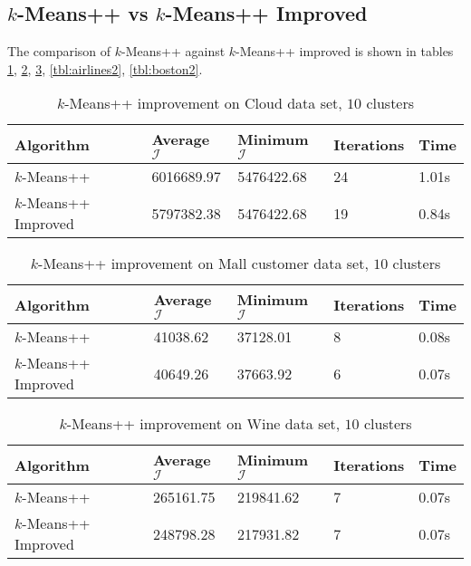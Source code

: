 \documentclass[twoside, 11pt]{article}
\newcommand{\I}{\mathcal{I}}
\begin{document}
	\subsection{$k$-Means++ vs $k$-Means++ Improved}
	The comparison of $k$-Means++ against $k$-Means++ improved is shown in tables \ref{tbl:cloud2}, \ref{tbl:mall2}, \ref{tbl:wine2}, \ref{tbl:airlines2}, \ref{tbl:boston2}.
		\begin{table}
			\begin{center}
				\begin{tabular}{|l|l|l|l|l|}
					\hline
					Algorithm & Average $\I$& Minimum $\I$& Iterations & Time\\\hline
					$k$-Means++ & 6016689.97& 5476422.68& 24 & 1.01s\\\hline
					$k$-Means++ Improved& 5797382.38& 5476422.68 & 19& 0.84s\\\hline
				\end{tabular}
				\caption{$k$-Means++ improvement on Cloud data set, $10$ clusters}
				\label{tbl:cloud2}
			\end{center}
		\end{table}
	
		\begin{table}
			\begin{center}
				\begin{tabular}{|l|l|l|l|l|}
					\hline
					Algorithm & Average $\I$& Minimum $\I$& Iterations & Time\\\hline
					$k$-Means++ & 41038.62& 37128.01& 8& 0.08s\\\hline
					$k$-Means++ Improved& 40649.26& 37663.92 & 6& 0.07s\\\hline
				\end{tabular}
				\caption{$k$-Means++ improvement on Mall customer data set, $10$ clusters}
				\label{tbl:mall2}
			\end{center}
		\end{table}
	
		\begin{table}
			\begin{center}
				\begin{tabular}{|l|l|l|l|l|}
					\hline
					Algorithm & Average $\I$& Minimum $\I$& Iterations & Time\\\hline
					$k$-Means++ & 265161.75& 219841.62& 7& 0.07s\\\hline
					$k$-Means++ Improved& 248798.28& 217931.82& 7& 0.07s\\\hline
				\end{tabular}
				\caption{$k$-Means++ improvement on Wine data set, $10$ clusters}
				\label{tbl:wine2}
			\end{center}
		\end{table}
	
\end{document}
